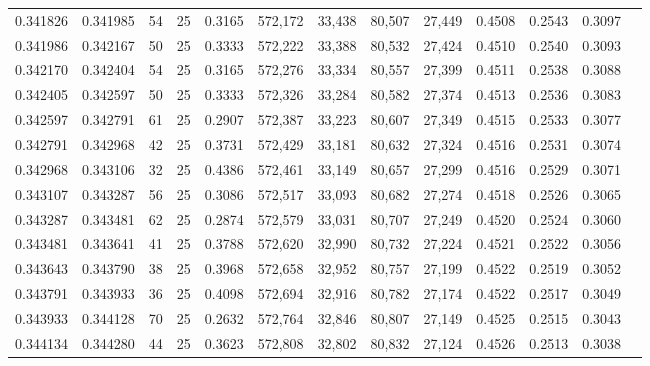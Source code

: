\begin{tabular}{rrrrrrrrrrrrr}
0.341826 & 0.341985 &    54 &  25 &                                     0.3165 & 572,172 &  33,438 &  80,507 &  27,449 & 0.4508 & 0.2543 & 0.3097 \\
0.341986 & 0.342167 &    50 &  25 &                                     0.3333 & 572,222 &  33,388 &  80,532 &  27,424 & 0.4510 & 0.2540 & 0.3093 \\
0.342170 & 0.342404 &    54 &  25 &                                     0.3165 & 572,276 &  33,334 &  80,557 &  27,399 & 0.4511 & 0.2538 & 0.3088 \\
0.342405 & 0.342597 &    50 &  25 &                                     0.3333 & 572,326 &  33,284 &  80,582 &  27,374 & 0.4513 & 0.2536 & 0.3083 \\
0.342597 & 0.342791 &    61 &  25 &                                     0.2907 & 572,387 &  33,223 &  80,607 &  27,349 & 0.4515 & 0.2533 & 0.3077 \\
0.342791 & 0.342968 &    42 &  25 &                                     0.3731 & 572,429 &  33,181 &  80,632 &  27,324 & 0.4516 & 0.2531 & 0.3074 \\
0.342968 & 0.343106 &    32 &  25 &                                     0.4386 & 572,461 &  33,149 &  80,657 &  27,299 & 0.4516 & 0.2529 & 0.3071 \\
0.343107 & 0.343287 &    56 &  25 &                                     0.3086 & 572,517 &  33,093 &  80,682 &  27,274 & 0.4518 & 0.2526 & 0.3065 \\
0.343287 & 0.343481 &    62 &  25 &                                     0.2874 & 572,579 &  33,031 &  80,707 &  27,249 & 0.4520 & 0.2524 & 0.3060 \\
0.343481 & 0.343641 &    41 &  25 &                                     0.3788 & 572,620 &  32,990 &  80,732 &  27,224 & 0.4521 & 0.2522 & 0.3056 \\
0.343643 & 0.343790 &    38 &  25 &                                     0.3968 & 572,658 &  32,952 &  80,757 &  27,199 & 0.4522 & 0.2519 & 0.3052 \\
0.343791 & 0.343933 &    36 &  25 &                                     0.4098 & 572,694 &  32,916 &  80,782 &  27,174 & 0.4522 & 0.2517 & 0.3049 \\
0.343933 & 0.344128 &    70 &  25 &                                     0.2632 & 572,764 &  32,846 &  80,807 &  27,149 & 0.4525 & 0.2515 & 0.3043 \\
0.344134 & 0.344280 &    44 &  25 &                                     0.3623 & 572,808 &  32,802 &  80,832 &  27,124 & 0.4526 & 0.2513 & 0.3038 \\

\end{tabular}
